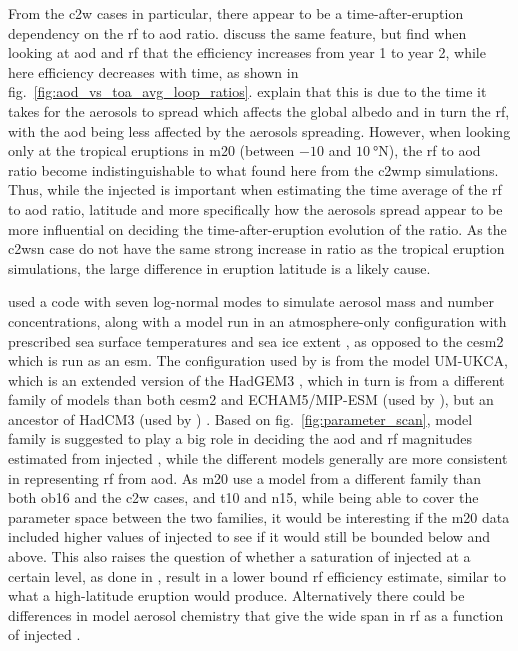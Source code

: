 \documentclass{ametsocV6.1}
\newcommand{\iso}[1][i]{{#1}njected \ce{SO2}}
\begin{document}
From the \gls{c2w} cases in particular, there appear to be a time-after-eruption
dependency on the \gls{rf} to \gls{aod} ratio. \citet{marshall2020} discuss the same
feature, but find when looking at \gls{aod} and \gls{rf} that the efficiency increases
from year 1 to year 2, while here efficiency decreases with time, as shown in
fig.~\ref{fig:aod_vs_toa_avg_loop_ratios}. \citet{marshall2020} explain that this is due
to the time it takes for the aerosols to spread which affects the global albedo and in
turn the \gls{rf}, with the \gls{aod} being less affected by the aerosols spreading.
However, when looking only at the tropical eruptions in \gls{m20} (between \(-10\) and
\(\SI{10}{\degree\mathrm{N}}\)), the \gls{rf} to \gls{aod} ratio become
indistinguishable to what found here from the \gls{c2wmp} simulations. Thus, while the
\iso{} is important when estimating the time average of the \gls{rf} to \gls{aod} ratio,
latitude and more specifically how the aerosols spread appear to be more influential on
deciding the time-after-eruption evolution of the ratio. As the \gls{c2wsn} case do not
have the same strong increase in ratio as the tropical eruption simulations, the large
difference in eruption latitude is a likely cause.

\citet{marshall2019, marshall2020, marshall2021} used a code with seven log-normal modes
to simulate aerosol mass and number concentrations, along with a model run in an
atmosphere-only configuration with prescribed sea surface temperatures and sea ice
extent \citep{marshall2019}, as opposed to the \gls{cesm2} which is run as an \gls{esm}.
The configuration used by \citet{marshall2019} is from the model UM-UKCA, which is an
extended version of the HadGEM3 \citep{dhomse2014}, which in turn is from a different
family of models than both \gls{cesm2} and ECHAM5/MIP-ESM (used by
\citet{timmreck2010,niemeier2015}), but an ancestor of HadCM3 (used by
\citet{gregory2016}) \citep{kuma2023}. Based on fig.~\ref{fig:parameter_scan}, model
family is suggested to play a big role in deciding the \gls{aod} and \gls{rf} magnitudes
estimated from \iso{}, while the different models generally are more consistent in
representing \gls{rf} from \gls{aod}. As \gls{m20} use a model from a different family
than both \gls{ob16} and the \gls{c2w} cases, and \gls{t10} and \gls{n15}, while being
able to cover the parameter space between the two families, it would be interesting if
the \gls{m20} data included higher values of \iso{} to see if it would still be bounded
below and above. This also raises the question of whether a saturation of \iso{} at a
certain level, as done in \citet{niemeier2015}, result in a lower bound \gls{rf}
efficiency estimate, similar to what a high-latitude eruption would produce.
Alternatively there could be differences in model aerosol chemistry that give the wide
span in \gls{rf} as a function of \iso{}.
\end{document}
